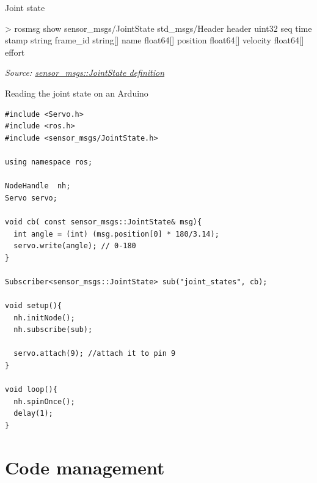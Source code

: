 \documentclass[compress]{beamer}
\newcommand{\source}[2]{{\tiny\it Source: \href{#1}{#2}}}
\begin{document}
\begin{frame}[fragile]{Joint state}
\begin{shcode}
> rosmsg show sensor_msgs/JointState 
std_msgs/Header header
  uint32 seq
  time stamp
  string frame_id
string[] name
float64[] position
float64[] velocity
float64[] effort
\end{shcode}

\source{http://docs.ros.org/api/sensor_msgs/html/msg/JointState.html}{sensor\_msgs::JointState definition}
\end{frame}


\begin{frame}[fragile]{Reading the joint state on an Arduino}

\begin{verbatim}
#include <Servo.h> 
#include <ros.h>
#include <sensor_msgs/JointState.h>

using namespace ros;

NodeHandle  nh;
Servo servo;

void cb( const sensor_msgs::JointState& msg){
  int angle = (int) (msg.position[0] * 180/3.14);
  servo.write(angle); // 0-180
}

Subscriber<sensor_msgs::JointState> sub("joint_states", cb);

void setup(){
  nh.initNode();
  nh.subscribe(sub);
  
  servo.attach(9); //attach it to pin 9
}

void loop(){
  nh.spinOnce();
  delay(1);
}
\end{verbatim}

\end{frame}



\section[Code]{Code management}
\end{document}
